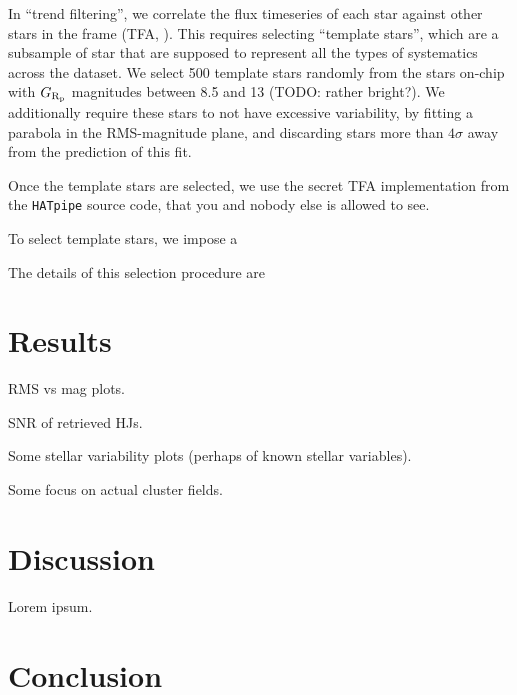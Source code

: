 \documentclass[12pt,twocolumn,tighten]{aastex62}
\begin{document}
In ``trend filtering'', we correlate the flux timeseries of each star
against other stars in the frame (TFA, \citealt{kovacs_trend_2005}).
This requires selecting ``template stars'', which are a subsample of
star that are supposed to represent all the types of systematics
across the dataset. 
We select 500 template stars randomly from the stars on-chip with
$G_{\rm R_p}$ magnitudes between 8.5 and 13 (TODO: rather bright?).
We additionally require these stars to not have excessive variability,
by fitting a parabola in the RMS-magnitude plane, and discarding stars
more than $4\sigma$ away from the prediction of this fit.

Once the template stars are selected, we use the secret TFA
implementation from the \texttt{HATpipe} source code, that you and
nobody else is allowed to see.

To select template stars, we impose a 

The details of this selection procedure are 


\section{Results}
\label{sec:results}

RMS vs mag plots.

SNR of retrieved HJs.

Some stellar variability plots (perhaps of known stellar variables).

Some focus on actual cluster fields.


\section{Discussion}
\label{sec:discussion}

Lorem ipsum.

\section{Conclusion}
\label{sec:conclusion}

\end{document}
